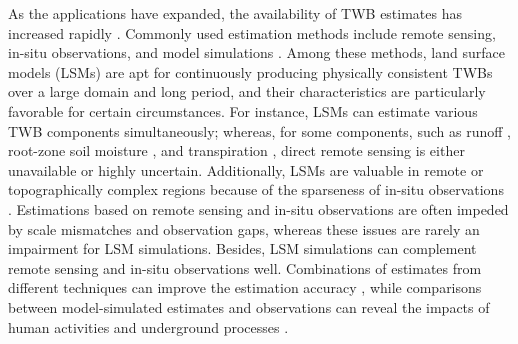 \documentclass[essd, manuscript]{copernicus}
\begin{document}
As the applications have expanded, the availability of TWB estimates has increased rapidly \citep{peters-lidard2018MM, saxe2021HESS, zhang2018HESS}. Commonly used estimation methods include remote sensing, in-situ observations, and model simulations \citep{saxe2021HESS, mccabe2017HESS, pan2012JC, gao2010IJRS, trenberth2007JH}. Among these methods, land surface models (LSMs) are apt for continuously producing physically consistent TWBs over a large domain and long period, and their characteristics are particularly favorable for certain circumstances. For instance, LSMs can estimate various TWB components simultaneously; whereas, for some components, such as runoff \citep{lin2019WRRa, beck2017HESS}, root-zone soil moisture \citep{xia2015JHa, xia2015JH}, and transpiration \citep{lian2018NCC}, direct remote sensing is either unavailable or highly uncertain. Additionally, LSMs are valuable in remote or topographically complex regions because of the sparseness of in-situ observations \citep{kim2021TC}. Estimations based on remote sensing and in-situ observations are often impeded by scale mismatches and observation gaps, whereas these issues are rarely an impairment for LSM simulations. Besides, LSM simulations can complement remote sensing and in-situ observations well. Combinations of estimates from different techniques can improve the estimation accuracy \citep{zhang2018HESS, pan2012JC, zhao2018RSE}, while comparisons between model-simulated estimates and observations can reveal the impacts of human activities \citep{zaussinger2019HESS} and underground processes \citep{zheng2020JAMES}.
\end{document}

